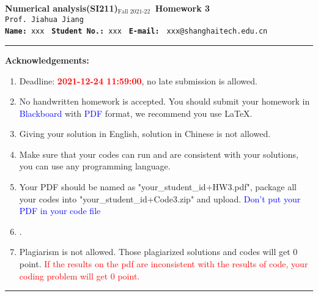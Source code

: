 \documentclass[11pt]{article}
\begin{document}
\begin{center}
	\textbf{\LARGE{Numerical analysis(SI211)$_\text{Fall 2021-22}\,$ Homework 3 } } \\
	\texttt{Prof. Jiahua Jiang }\\
	\texttt{\textbf{Name:} xxx }  \quad 
	\texttt{\textbf{Student No.:} xxx }  \quad 
	\texttt{\textbf{E-mail:}} \texttt{ xxx@shanghaitech.edu.cn}
\par\end{center}

\noindent
\rule{\linewidth}{0.4pt}
{\bf {\large Acknowledgements:}}
\begin{enumerate} 
    \item Deadline: \textcolor{red}{\textbf{2021-12-24 11:59:00}}, no late submission is allowed.
    \item No handwritten homework is accepted. You should submit your homework in \textcolor{blue}{Blackboard} with \textcolor{blue}{PDF} format, we recommend you use \LaTeX. 
    \item Giving your solution in English, solution in Chinese is not allowed.
    \item Make sure that your codes can run and are consistent with your solutions, you can use any  programming language. 
    \item Your PDF should be named as "{\sf your\_student\_id+HW3.pdf}", package all your codes into "{\sf your\_student\_id+Code3.zip}" and upload. \textcolor{blue}{ Don't put your PDF in your code file} 
    \item \color{blue}{All the results from your code should be shown in pdf but please do not inset your code into \LaTeX }.
    \item Plagiarism is not allowed. Those plagiarized solutions and codes will get 0 point. \textcolor{red}{
    If the results on the pdf are inconsistent with the results of code, your coding problem will get 0 point.}
    \end{enumerate}
\rule{\linewidth}{0.4pt}
\end{document}
